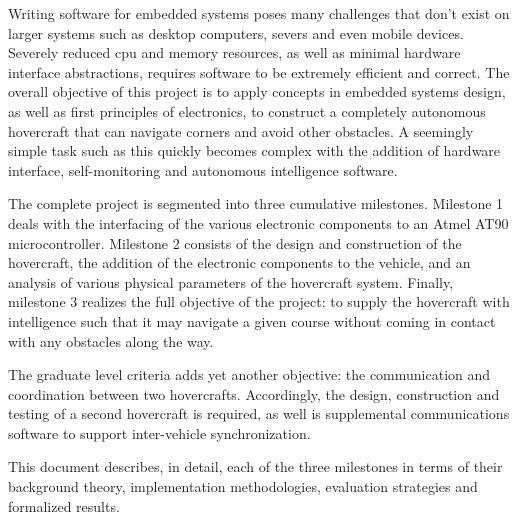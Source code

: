 Writing software for embedded systems poses many challenges that don't exist on larger systems such as desktop computers, severs and even mobile devices.  Severely reduced cpu and memory resources, as well as minimal hardware interface abstractions, requires software to be extremely efficient and correct.  The overall objective of this project is to apply concepts in embedded systems design, as well as first principles of electronics, to construct a completely autonomous hovercraft that can navigate corners and avoid other obstacles.  A seemingly simple task such as this quickly becomes complex with the addition of hardware interface, self-monitoring and autonomous intelligence software.  

The complete project is segmented into three cumulative milestones.  Milestone 1 deals with the interfacing of the various electronic components to an Atmel AT90 microcontroller.  Milestone 2 consists of the design and construction of the hovercraft, the addition of the electronic components to the vehicle, and an analysis of various physical parameters of the hovercraft system.  Finally, milestone 3 realizes the full objective of the project: to supply the hovercraft with intelligence such that it may navigate a given course without coming in contact with any obstacles along the way.  

The graduate level criteria adds yet another objective: the communication and coordination between two hovercrafts.  Accordingly, the design, construction and testing of a second hovercraft is required, as well is supplemental communications software to support inter-vehicle synchronization.

This document describes, in detail, each of the three milestones in terms of their background theory, implementation methodologies, evaluation strategies and formalized results.  